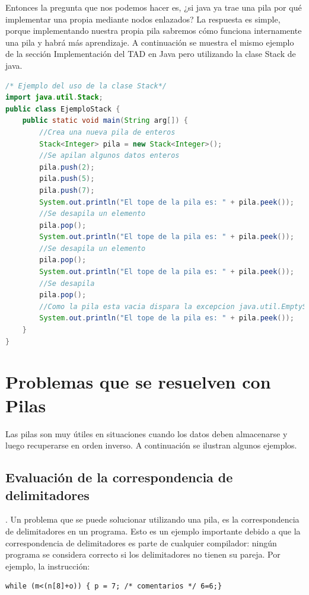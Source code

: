 Entonces la pregunta que nos podemos hacer es, ¿si java ya trae una pila por qué implementar una propia mediante nodos enlazados? La respuesta es simple, porque implementando nuestra propia pila sabremos cómo funciona internamente una pila y habrá más aprendizaje. A continuación se muestra el mismo ejemplo de la sección Implementación del TAD en Java pero utilizando la clase Stack de java.

\begin{lstlisting}[language=Java]
/* Ejemplo del uso de la clase Stack*/
import java.util.Stack;
public class EjemploStack {
    public static void main(String arg[]) {
        //Crea una nueva pila de enteros
        Stack<Integer> pila = new Stack<Integer>();   
		//Se apilan algunos datos enteros
		pila.push(2);
		pila.push(5);
		pila.push(7);
		System.out.println("El tope de la pila es: " + pila.peek());
		//Se desapila un elemento
		pila.pop();
		System.out.println("El tope de la pila es: " + pila.peek());
		//Se desapila un elemento
		pila.pop();
		System.out.println("El tope de la pila es: " + pila.peek());
		//Se desapila
		pila.pop();
		//Como la pila esta vacia dispara la excepcion java.util.EmptyStackException
		System.out.println("El tope de la pila es: " + pila.peek());
    }
}
\end{lstlisting}


\section{Problemas que se resuelven con Pilas}
Las pilas son muy útiles en situaciones cuando los datos deben almacenarse y luego recuperarse en orden inverso. A continuación se ilustran algunos ejemplos.

\subsection{Evaluación de la correspondencia de delimitadores}
. Un problema que se puede solucionar utilizando una pila, es la correspondencia de delimitadores en un programa.  Esto es un ejemplo importante debido a que la correspondencia de delimitadores es parte de cualquier compilador: ningún programa se considera correcto si los delimitadores no tienen su pareja. Por ejemplo, la instrucción:

\begin{lstlisting}[numbers=none]
while (m<(n[8]+o)) { p = 7; /* comentarios */ 6=6;}
\end{lstlisting}

